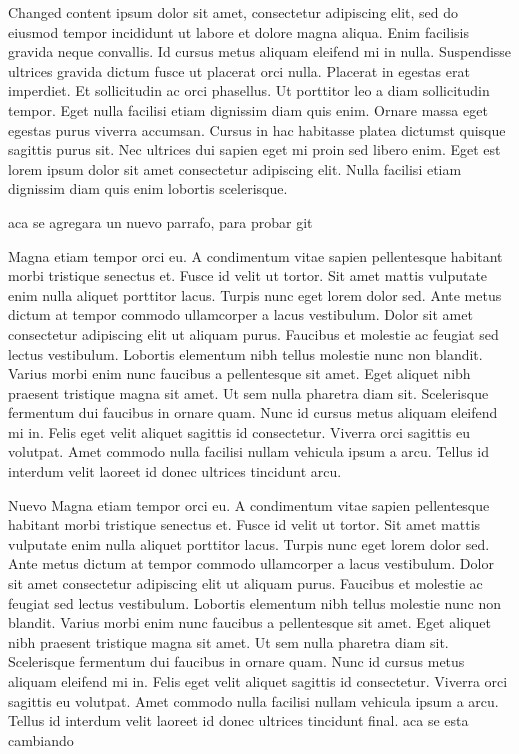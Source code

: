 \documentclass[11pt]{article}
\begin{document}
    Changed content ipsum dolor sit amet, consectetur adipiscing elit, sed do eiusmod tempor incididunt ut labore et dolore
    magna aliqua. Enim facilisis gravida neque convallis. Id cursus metus aliquam eleifend mi in nulla. Suspendisse
    ultrices gravida dictum fusce ut placerat orci nulla. Placerat in egestas erat imperdiet. Et sollicitudin ac orci
    phasellus. Ut porttitor leo a diam sollicitudin tempor. Eget nulla facilisi etiam dignissim diam quis enim.
    Ornare massa eget egestas purus viverra accumsan. Cursus in hac habitasse platea dictumst quisque sagittis purus
    sit. Nec ultrices dui sapien eget mi proin sed libero enim. Eget est lorem ipsum dolor sit amet consectetur
    adipiscing elit. Nulla facilisi etiam dignissim diam quis enim lobortis scelerisque.

    aca se agregara un nuevo parrafo, para probar git

     

    Magna etiam tempor orci eu. A condimentum vitae sapien pellentesque habitant morbi tristique senectus et. Fusce
    id velit ut tortor. Sit amet mattis vulputate enim nulla aliquet porttitor lacus. Turpis nunc eget lorem dolor
    sed. Ante metus dictum at tempor commodo ullamcorper a lacus vestibulum. Dolor sit amet consectetur adipiscing
    elit ut aliquam purus. Faucibus et molestie ac feugiat sed lectus vestibulum. Lobortis elementum nibh tellus
    molestie nunc non blandit. Varius morbi enim nunc faucibus a pellentesque sit amet. Eget aliquet nibh praesent
    tristique magna sit amet. Ut sem nulla pharetra diam sit. Scelerisque fermentum dui faucibus in ornare quam. Nunc
    id cursus metus aliquam eleifend mi in. Felis eget velit aliquet sagittis id consectetur. Viverra orci sagittis
    eu volutpat. Amet commodo nulla facilisi nullam vehicula ipsum a arcu. Tellus id interdum velit laoreet id donec
    ultrices tincidunt arcu.

    Nuevo Magna etiam tempor orci eu. A condimentum vitae sapien pellentesque habitant morbi tristique senectus et. Fusce
    id velit ut tortor. Sit amet mattis vulputate enim nulla aliquet porttitor lacus. Turpis nunc eget lorem dolor
    sed. Ante metus dictum at tempor commodo ullamcorper a lacus vestibulum. Dolor sit amet consectetur adipiscing
    elit ut aliquam purus. Faucibus et molestie ac feugiat sed lectus vestibulum. Lobortis elementum nibh tellus
    molestie nunc non blandit. Varius morbi enim nunc faucibus a pellentesque sit amet. Eget aliquet nibh praesent
    tristique magna sit amet. Ut sem nulla pharetra diam sit. Scelerisque fermentum dui faucibus in ornare quam. Nunc
    id cursus metus aliquam eleifend mi in. Felis eget velit aliquet sagittis id consectetur. Viverra orci sagittis
    eu volutpat. Amet commodo nulla facilisi nullam vehicula ipsum a arcu. Tellus id interdum velit laoreet id donec
    ultrices tincidunt final. aca se esta cambiando
\end{document}
